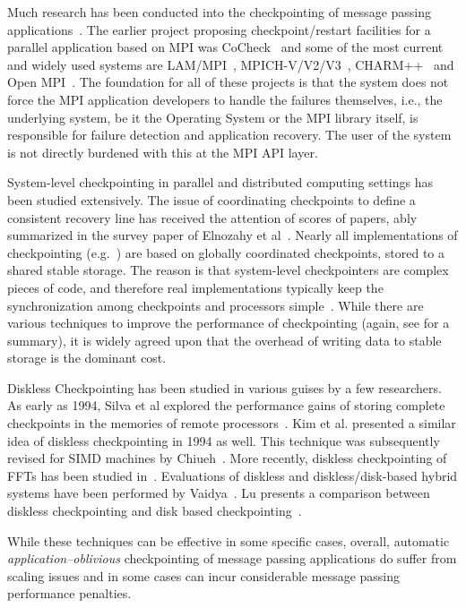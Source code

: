 \documentclass[pdftex,11pt]{article}
\begin{document}
Much research has been conducted into the checkpointing of message
passing applications~\cite{BLKC:03}. The earlier project proposing
checkpoint/restart facilities for a parallel application based on MPI
was CoCheck~\cite{Stel:96} and some of the most current and widely
used systems are LAM/MPI~\cite{BuDV:94}, MPICH-V/V2/V3~\cite{BLKC:03},
CHARM++~\cite{CHARM++} and Open MPI~\cite{ompiv:08}. The foundation
for all of these projects is that the system does not force the MPI
application developers to handle the failures themselves, i.e., the
underlying system, be it the Operating System or the MPI library
itself, is responsible for failure detection and application recovery.
The user of the system is not directly burdened with this at the MPI
API layer.

System-level checkpointing in parallel and distributed computing
settings has been studied extensively.  The issue of coordinating
checkpoints to define a consistent recovery line has received the
attention of scores of papers, ably summarized in the survey paper of
Elnozahy et al~\cite{EAWJ:02}.  Nearly all implementations of
checkpointing (e.g.~\cite{AgFr:99, Casa:95, ClGi:96, ElJZ:92, LeFS:93,
  LiTs:97, NaMM:97, PrLi:96, SiSi:92, Stel:94, Stel:96}) are based on
globally coordinated checkpoints, stored to a shared stable storage.
The reason is that system-level checkpointers are complex pieces of
code, and therefore real implementations typically keep the
synchronization among checkpoints and processors
simple~\cite{HuWa:95}.  While there are various techniques to improve
the performance of checkpointing (again, see \cite{EAWJ:02} for a
summary), it is widely agreed upon that the overhead of writing data
to stable storage is the dominant cost.

Diskless Checkpointing has been studied in various guises by a few
researchers.  As early as 1994, Silva et al explored the performance
gains of storing complete checkpoints in the memories of remote
processors~\cite{SIVS:94}.  Kim et al. \cite{PlKD:95} presented a
similar idea of diskless checkpointing in 1994 as well.  This
technique was subsequently revised for SIMD machines by
Chiueh~\cite{ChDe:96}.  More recently, diskless checkpointing of FFTs
has been studied in~\cite{EnGe:03}.  Evaluations of diskless and
diskless/disk-based hybrid systems have been performed by
Vaidya~\cite{Vaid:95}.  Lu presents a comparison between diskless
checkpointing and disk based checkpointing~\cite{Lu:2005}.

While these techniques can be effective in some specific cases,
overall, automatic \textit{application--oblivious} checkpointing of
message passing applications do suffer from scaling issues and in some
cases can incur considerable message passing performance penalties.
\end{document}
